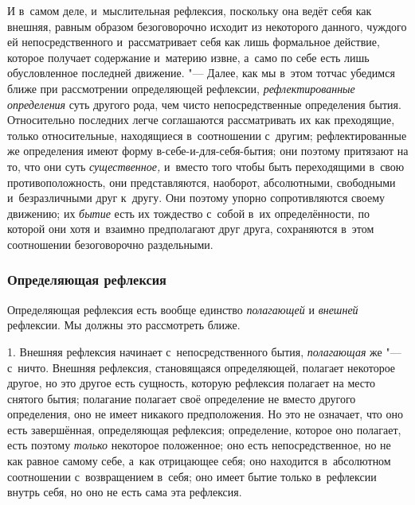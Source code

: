И в~самом деле, и~мыслительная рефлексия, поскольку она ведёт себя как
внешняя, равным образом безоговорочно исходит из некоторого данного,
чуждого ей непосредственного и~рассматривает себя как лишь формальное
действие, которое получает содержание и~материю извне, а~само по себе есть
лишь обусловленное последней движение. "--- Далее, как мы в~этом тотчас
убедимся ближе при рассмотрении определяющей рефлексии,
{\em рефлектированные определения} суть другого рода,
чем чисто непосредственные определения бытия. Относительно последних легче
соглашаются рассматривать их как преходящие, только относительные,
находящиеся в~соотношении с~другим; рефлектированные же определения имеют
форму в-себе-и-для-себя-бытия; они поэтому притязают на то, что они суть
{\em существенное,} и~вместо того чтобы быть
переходящими в~свою противоположность, они представляются, наоборот,
абсолютными, свободными и~безразличными друг к~другу. Они поэтому упорно
сопротивляются своему движению; их {\em бытие} есть их
тождество с~собой в~их определённости, по которой они хотя и~взаимно
предполагают друг друга, сохраняются в~этом соотношении безоговорочно
раздельными.

\subsubsection{Определяющая рефлексия}
Определяющая рефлексия есть вообще единство
{\em полагающей} и {\em внешней}
рефлексии. Мы должны это рассмотреть ближе.

1. Внешняя рефлексия начинает с~непосредственного бытия,
{\em полагающая} же "--- с~ничто. Внешняя рефлексия,
становящаяся определяющей, полагает некоторое другое, но это другое есть
сущность, которую рефлексия полагает на место снятого бытия; полагание
полагает своё определение не вместо другого определения, оно не имеет
никакого предположения. Но это не означает, что оно есть завершённая,
определяющая рефлексия; определение, которое оно полагает, есть поэтому
{\em только} некоторое положенное; оно есть
непосредственное, но не как равное самому себе, а~как отрицающее себя; оно
находится в~абсолютном соотношении с~возвращением в~себя; оно имеет бытие
только в~рефлексии внутрь себя, но оно не есть сама эта рефлексия.

